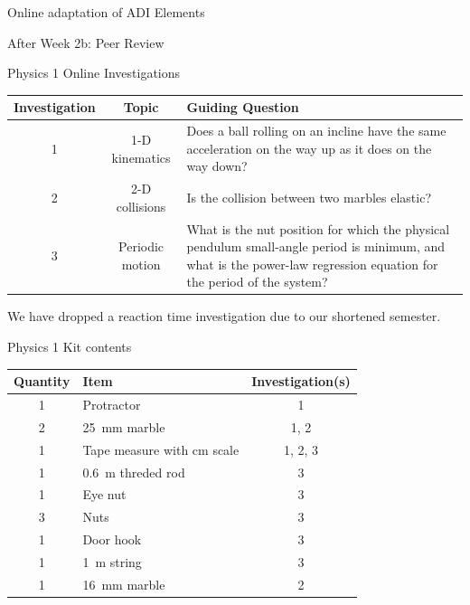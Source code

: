 \documentclass[xcolor=dvipsnames,table]{beamer}
\begin{document}
{\begin{frame}{Online adaptation of ADI Elements}
\begin{block}{After Week 2b: Peer Review}
\begin{minipage}{0.2\textwidth}
    \end{minipage}
  \end{block}
\end{frame}
}

\begin{frame}{Physics 1 Online Investigations}
  \begin{center}\scriptsize
    \begin{tabular}{ccp{14em}}
      \hline\hline
      Investigation & Topic & Guiding Question\\
      \hline
      1 & 1-D kinematics & Does a ball rolling on an incline have the same acceleration on the way up as it does on the way down? \\
      2 & 2-D collisions & Is the collision between two marbles elastic? \\
      3 & Periodic motion & What is the nut position for which the physical pendulum small-angle period is minimum, and what is the power-law regression equation for the period of the system? \\
      \hline\hline
    \end{tabular}
  \end{center}
  We have dropped a reaction time investigation due to our shortened semester.
\end{frame}


\begin{frame}{Physics 1 Kit contents}
  \begin{center}
    \begin{tabular}{clc}
      \hline\hline
      Quantity & Item & Investigation(s)\\
      \hline
      1 & Protractor & 1 \\
      2 & \SI{25}{mm} marble & 1, 2 \\
      1 & Tape measure with cm scale & 1, 2, 3\\
      1 & \SI{0.6}{m} threded rod & 3 \\
      1 & Eye nut & 3 \\
      3 & Nuts & 3 \\
      1 & Door hook & 3 \\
      1 & \SI{1}{m} string & 3 \\
      1 & \SI{16}{mm} marble & 2 \\
      \hline\hline
    \end{tabular}
  \end{center}
\end{frame}
\end{document}
